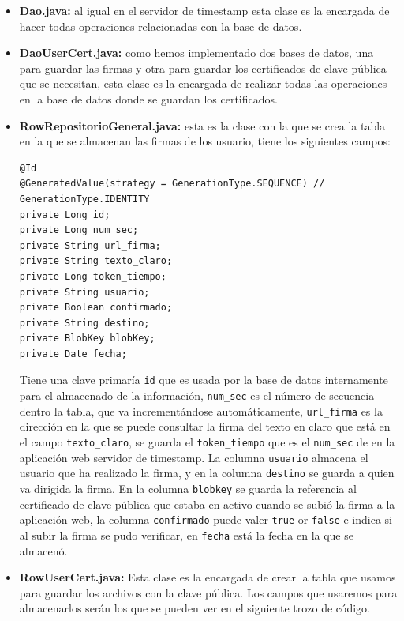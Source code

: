 \begin{itemize}

\item \textbf{Dao.java:} al igual en el servidor de timestamp esta clase es la encargada de hacer todas operaciones relacionadas con la base de datos.

\item \textbf{DaoUserCert.java:} como hemos implementado dos bases de datos, una para guardar las firmas y otra para guardar los certificados de clave pública que se necesitan, esta clase es la encargada de realizar todas las operaciones en la base de datos donde se guardan los certificados. 

\item \textbf{RowRepositorioGeneral.java:} esta es la clase con la que se crea la tabla en la que se almacenan las firmas de los usuario, tiene los siguientes campos:  

\begin{lstlisting}[style=Java]
@Id
@GeneratedValue(strategy = GenerationType.SEQUENCE) //	 GenerationType.IDENTITY
private Long id;
private Long num_sec;
private String url_firma;
private String texto_claro;
private Long token_tiempo;
private String usuario;
private Boolean confirmado;
private String destino;
private BlobKey blobKey;
private Date fecha;
\end{lstlisting}

Tiene una clave primaría \lstinline{id} que es usada por la base de datos internamente para el almacenado de la información, \lstinline{num_sec} es el número de secuencia dentro la tabla, que va incrementándose automáticamente, \lstinline{url_firma} es la dirección en la que se puede consultar la firma del texto en claro que está en el campo \lstinline{texto_claro}, se guarda el \lstinline{token_tiempo} que es el \lstinline{num_sec} de en la aplicación web servidor de timestamp. La columna \lstinline{usuario} almacena el usuario que ha realizado la firma, y en la columna \lstinline{destino} se guarda a quien va dirigida la firma. En la columna \lstinline{blobkey} se guarda la referencia al certificado de clave pública que estaba en activo cuando se subió la firma a la aplicación web, la columna \lstinline{confirmado} puede valer \lstinline{true} or \lstinline{false} e indica si al subir la firma se pudo verificar, en \lstinline{fecha} está la fecha en la que se almacenó.

\item \textbf{RowUserCert.java:} Esta clase es la encargada de crear la tabla que usamos para guardar los archivos con la clave pública. Los campos que usaremos para almacenarlos serán los que se pueden ver en el siguiente trozo de código.


\end{itemize}
